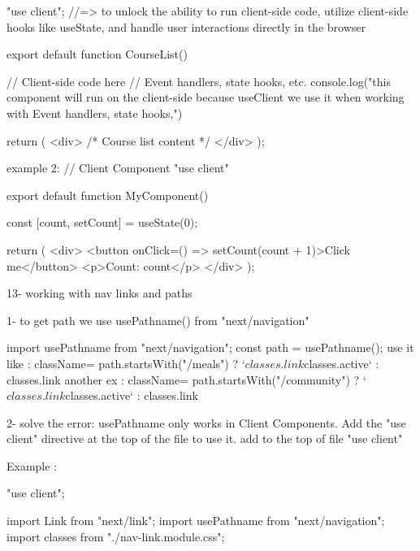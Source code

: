                 "use client"; //=> to unlock the ability to run client-side code, utilize client-side hooks like useState, and handle user interactions directly in the browser

                export default function CourseList() {
                    // Client-side code here
                    // Event handlers, state hooks, etc.
                    console.log("this component will run on the client-side because useClient we use it when working with Event handlers, state hooks,")

                    return (
                        <div>
                        {/* Course list content */}
                        </div>
                    );
                    }

            example 2:
                    // Client Component
                    "use client"

                    export default function MyComponent() {
                    const [count, setCount] = useState(0);

                    return (
                        <div>
                        <button onClick={() => setCount(count + 1)}>Click me</button>
                        <p>Count: {count}</p>
                        </div>
                    );
                    }


13- working with nav links and paths
    
    1- to get path we use usePathname() from "next/navigation"

            import { usePathname } from "next/navigation";
            const path = usePathname();
            use it like : className={
                                path.startsWith("/meals")
                                ? `${classes.link} ${classes.active}`
                                : classes.link
                            }
            another ex : className={
                                path.startsWith("/community")
                                ? `${classes.link} ${classes.active}`
                                : classes.link
                            }

    2- solve the error:
        usePathname only works in Client Components. Add the "use client" directive at the top of the file to use it. 
        add to the top of file "use client"

        Example : 
        
                        "use client";

                        import Link from "next/link";
                        import { usePathname } from "next/navigation";
                        import classes from "./nav-link.module.css";

